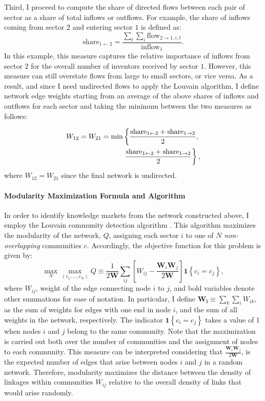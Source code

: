 Third, I proceed to compute the share of directed flows between each
pair of sector as a share of total inflows or outflows. For example,
the share of inflows coming from sector $2$ and entering sector $1$
is defined as:
\[
\text{share}_{1\ensuremath{\leftarrow}2}=\frac{\sum_{t}\sum_{i}\text{flow}_{2\rightarrow1,i,t}}{\text{inflow}_{1}}.
\]
 In this example, this measure captures the relative importance of
inflows from sector $2$ for the overall number of inventors received
by sector $1$. However, this measure can still overstate flows from
large to small sectors, or vice versa. As a result, and since I need
undirected flows to apply the Louvain algorithm, I define network
edge weights starting from an average of the above shares of inflows
and outflows for each sector and taking the minimum between the two
measures as follows:

\begin{align*}
W_{12}=W_{21}=\min & \left\lbrace \frac{\text{share}_{\text{1\ensuremath{\leftarrow}2}}+\text{share}_{\text{1\ensuremath{\rightarrow}2}}}{2},\right.\\
 & \left.\frac{\text{share}_{\text{1\ensuremath{\leftarrow}2}}+\text{share}_{\text{1\ensuremath{\rightarrow}2}}}{2}\right\rbrace ,
\end{align*}
where $W_{12}=W_{21}$ since the final network is undirected.

\paragraph{Modularity Maximization Formula and Algorithm}

In order to identify knowledge markets from the network constructed
above, I employ the Louvain community detection algorithm \citep{blondelFastUnfoldingCommunities2008}.
This algorithm maximizes the modularity of the network, $Q$, assigning
each sector $i$ to one of $N$ \emph{non-overlapping }communities
$c$. Accordingly, the objective function for this problem is given
by:
\[
\max_{N}\max_{\left(c_{1},\dots,c_{N}\right)}Q\equiv\frac{1}{2\bm{W}}\sum_{ij}\left[W_{ij}-\frac{\bm{W}_{i}\bm{W}_{j}}{2\bm{W}}\right]\bm{1}\left\{ c_{i}=c_{j}\right\} ,
\]
where $W_{ij}$, weight of the edge connecting node $i$ to $j$,
and bold variables denote other summations for ease of notation. In
particular, I define $\bm{W_{i}}\equiv\sum_{k}\sum_{i}W_{ik},$ as
the sum of weights for edges with one end in node $i$, and the sum
of all weights in the network, respectively. The indicator $\bm{1}\left\{ c_{i}=c_{j}\right\} $
takes a value of 1 when nodes $i$ and $j$ belong to the same community.
Note that the maximization is carried out both over the number of
communities and the assignment of nodes to each community. This measure
can be interpreted considering that $\frac{\bm{W}_{i}\bm{W}_{j}}{2\bm{W}}$,
is the expected number of edges that arise between nodes $i$ and
$j$ in a random network. Therefore, modularity maximizes the distance
between the density of linkages within communities $W_{ij}$ relative
to the overall density of links that would arise randomly.

